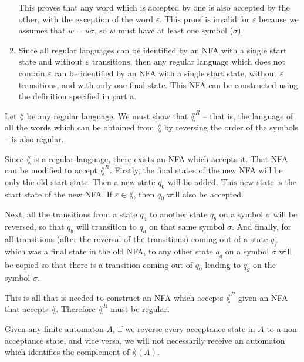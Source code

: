 \documentclass[fleqn]{article}
\begin{document}
\begin{answers}
\begin{enumerate}
				This proves that any word which is accepted by one is also accepted by the other, with the exception of the word \(\varepsilon\). This proof is invalid for \(\varepsilon\) because we assumes that \(w = u\sigma\), so \(w\) must have at least one symbol (\(\sigma\)).

			\item %
				Since all regular languages can be identified by an NFA with a single start state and without \(\varepsilon\) transitions, then any regular language which does not contain \(\varepsilon\) can be identified by an NFA with a single start state, without \(\varepsilon\) transitions, and with only one final state. This NFA can be constructed using the definition specified in part a.
		\end{enumerate}

	\item %
		Let \(\lang\) be any regular language. We must show that \(\lang^R\) -- that is, the language of all the words which can be obtained from \(\lang\) by reversing the order of the symbols -- is also regular.

		Since \(\lang\) is a regular language, there exists an NFA which accepts it. That NFA can be modified to accept \(\lang^R\). Firstly, the final states of the new NFA will be only the old start state. Then a new state \(q_0\) will be added. This new state is the start state of the new NFA. If \(\varepsilon \in \lang\), then \(q_0\) will also be accepted.

		Next, all the transitions from a state \(q_a\) to another state \(q_b\) on a symbol \(\sigma\) will be reversed, so that \(q_b\) will transition to \(q_a\) on that same symbol \(\sigma\). And finally, for all transitions (after the reversal of the transitions) coming out of a state \(q_f\) which was a final state in the old NFA, to any other state \(q_g\) on a symbol \(\sigma\) will be copied so that there is a transition coming out of \(q_0\) leading to \(q_g\) on the symbol \(\sigma\).

		This is all that is needed to construct an NFA which accepts \(\lang^R\) given an NFA that accepts \(\lang\). Therefore \(\lang^R\) must be regular.

	\item %
		Given any finite automaton \(A\), if we reverse every acceptance state in \(A\) to a non-acceptance state, and vice versa, we will not necessarily receive an automaton which identifies the complement of \(\lang(A)\).


\end{answers}
\end{document}
